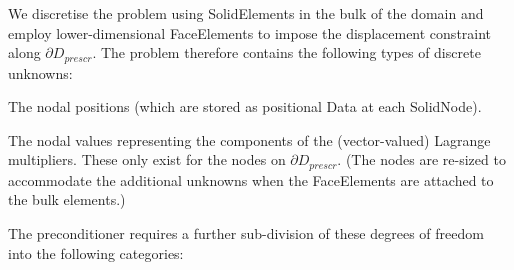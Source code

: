 We discretise the problem using {\ttfamily Solid\+Elements} in the bulk of the domain and employ lower-\/dimensional {\ttfamily Face\+Elements} to impose the displacement constraint along $ \partial D_{prescr}$. The problem therefore contains the following types of discrete unknowns\+:
\begin{DoxyItemize}
\item The nodal positions (which are stored as positional {\ttfamily Data} at each {\ttfamily Solid\+Node}). ~\newline
~\newline

\item The nodal values representing the components of the (vector-\/valued) Lagrange multipliers. These only exist for the nodes on $ \partial D_{prescr}$. (The nodes are re-\/sized to accommodate the additional unknowns when the {\ttfamily Face\+Elements} are attached to the bulk elements.)
\end{DoxyItemize}The preconditioner requires a further sub-\/division of these degrees of freedom into the following categories\+:
